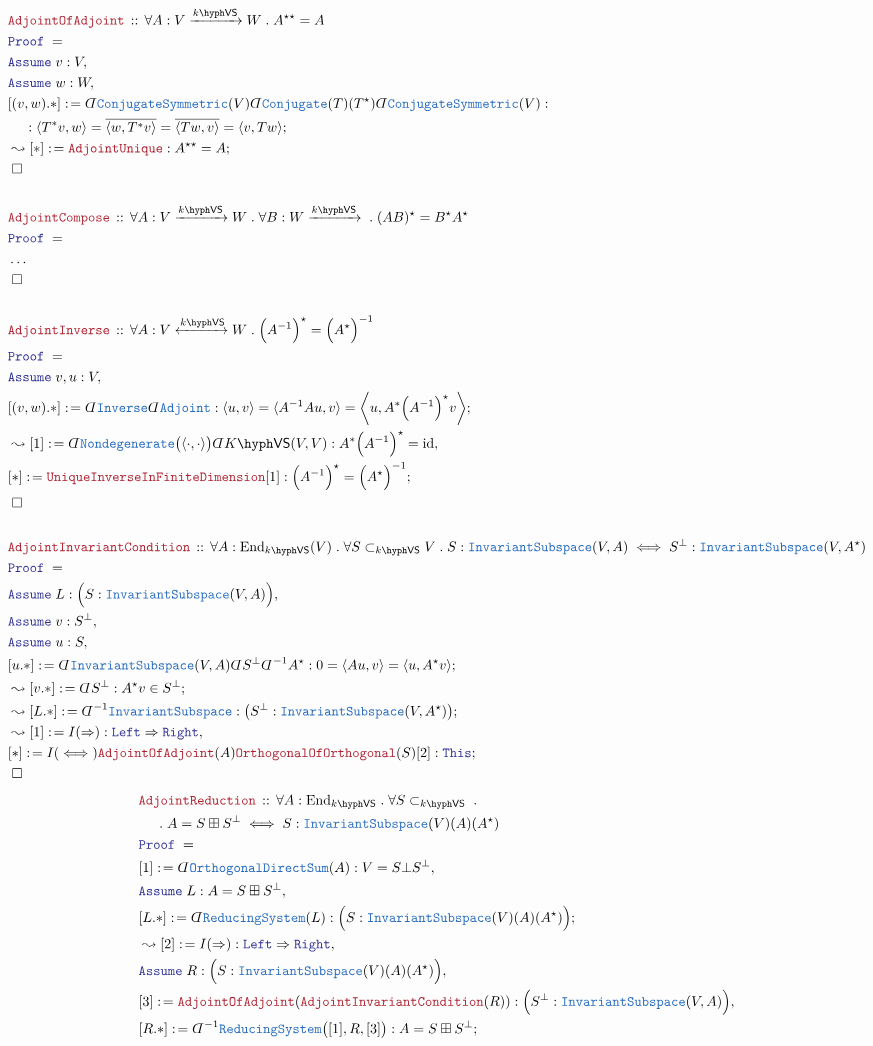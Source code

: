 \documentclass[12pt]{scrartcl}%
\newcommand{\TYPE}[1]{\textcolor{NavyBlue}{\mathtt{#1}}}%
\newcommand{\LOGIC}[1]{\textcolor{Blue}{\mathtt{#1}}}%
\newcommand{\THM}[1]{\textcolor{Maroon}{\mathtt{#1}}}%
\renewcommand{\.}{\; . \;} %
\newcommand{\de}{: \kern 0.1pc =} %
\newcommand{\Theorem}[2]{& \THM{#1} \, :: \, #2 \\ & \Proof = \\ } %
\newcommand{\NewLine}{\\ & \kern 1pc}%
\newcommand{\Page}[1]{ \begin{align*} #1 \end{align*}  }%
\newcommand{ \bd }{ \ByDef }%
\newcommand{\NoProof}{ & \ldots \\ \EndProof}%
\DeclareMathOperator*{\id}{id}%
\newcommand{\End}{\mathrm{End}}%
\newcommand{\Say}[3]{& #1 \de #2 : #3, \\} %
\newcommand{\Conclude}[3]{& #1 \de #2 : #3; \\}%
\newcommand{\Derive}[3]{& \leadsto #1 \de #2 : #3, \\} %
\newcommand{\DeriveConclude}[3]{& \leadsto #1 \de #2 : #3 ; \\} %
\newcommand{\Assume}[2]{& \LOGIC{Assume} \; #1 : #2, \\} %
\newcommand{\QED}{\; \square} %
\newcommand{\EndProof}{& \QED \\} %
\newcommand{\ByDef}{\rotatebox[origin=c]{-180}{$D$}}%
\newcommand{\Proof}{\LOGIC{Proof} \; } %
\newcommand{\Arrow}[1]{\xrightarrow{#1}}%
\newcommand{\ToIso}[1]{\xleftrightarrow{#1}}%
\newcommand{\subvec}[1]{\subset_{\VS{#1}}}%
\newcommand{\IS}{\TYPE{InvariantSubspace}}
\newcommand{\VS}[1]{#1\hyph\mathsf{VS}} %
\begin{document}
\Page{
	\Theorem{AdjointOfAdjoint}{\forall A : V \Arrow{\VS{k}} W \. A^{\star\star} = A}
	\Assume{v}{V}
	\Assume{w}{W}
	\Conclude{[(v,w).*]}{\bd \TYPE{ConjugateSymmetric}(V)\bd \TYPE{Conjugate}(T)(T^\star)\bd \TYPE{ConjugateSymmetric}(V)}
	{\NewLine : \langle T^*v, w \rangle = \overline{\langle w, T^*v \rangle} = \overline{\langle Tw, v \rangle} = \langle v, Tw \rangle}
	\DeriveConclude{[*]}{\THM{AdjointUnique}}{A^{\star\star} = A}
	\EndProof
	\\
	\Theorem{AdjointCompose}{\forall A : V \Arrow{\VS{k}} W \. \forall B : W \Arrow{\VS{k}} \. (AB)^\star = B^\star A^\star}
	\NoProof
	\\
	\Theorem{AdjointInverse}{\forall A : V \ToIso{\VS{k}} W \. \Big(A^{-1}\Big)^\star = \Big(A^\star\Big)^{-1}}
	\Assume{v,u}{V}
	\Conclude{[(v,w).*]}{\bd \TYPE{Inverse} \bd \TYPE{Adjoint}}
	{ \langle u,v \rangle = \langle A^{-1}Au,v \rangle = \bigg\langle u, A^* \Big(A^{-1}\Big)^\star v \bigg\rangle   }
	\Derive{[1]}{\bd \TYPE{Nondegenerate}\big(\langle\cdot,\cdot\rangle\big)\bd \VS{K}(V,V)}{A^* \Big( A^{-1} \Big)^\star = \id}
	\Conclude{[*]}{\THM{UniqueInverseInFiniteDimension}[1]}{\Big(A^{-1}\Big)^\star = \Big( A^\star\Big)^{-1}}
	\EndProof
	\\
	\Theorem{AdjointInvariantCondition}{\forall A : \End_{\VS{k}}(V) \. \forall S \subvec{k} V \. S : \IS(V,A) \iff S^\bot : \IS(V,A^\star)}
	\Assume{L}{\Big(S : \IS(V,A)\Big)}
	\Assume{v}{S^\bot}
	\Assume{u}{S}
	\Conclude{[u.*]}{\bd \IS(V,A)\bd S^\bot \bd^{-1} A^\star}{  0 = \langle Au, v \rangle = \langle u, A^\star v\rangle  }                                               
	\DeriveConclude{[v.*]}{\bd  S^\bot}{ A^\star v \in  S^\bot }
	\DeriveConclude{[L.*]}{ \bd^{-1} \IS  }{ \big(S^\bot : \IS(V,A^\star)\big)}
	\Derive{[1]}{I(\Rightarrow)}{\LOGIC{Left} \Rightarrow \LOGIC{Right}}
	\Conclude{[*]}{I(\iff)\THM{AdjointOfAdjoint}(A)\THM{OrthogonalOfOrthogonal}(S)[2]}{\LOGIC{This}}
	\EndProof
}\Page{
	\Theorem{AdjointReduction}{\forall A : \End_{\VS{k}} \. \forall S  \subvec{k} \.  \NewLine \. A = S \boxplus S^\bot \iff S : \IS(V)(A)(A^\star) }
	\Say{[1]}{\bd \TYPE{OrthogonalDirectSum}(A)}{ V = S \bot S^\bot}
	\Assume{L}{ A = S \boxplus S^\bot}
	\Conclude{[L.*]}{\bd \TYPE{ReducingSystem}(L)}{\Big(S : \IS(V)(A)(A^\star)\Big)}
	\Derive{[2]}{I(\Rightarrow)}{\LOGIC{Left} \Rightarrow \LOGIC{Right}}
	\Assume{R}{\Big( S : \IS(V)(A)(A^\star) \Big) }
	\Say{[3]}{\THM{AdjointOfAdjoint}(\THM{AdjointInvariantCondition}(R))}{\Big(S^\bot : \IS(V,A)\Big)  }
	\Conclude{[R.*]}{\bd^{-1}\TYPE{ReducingSystem}\big([1],R,[3]\big)}{A = S \boxplus S^\bot} 
}
\end{document}
